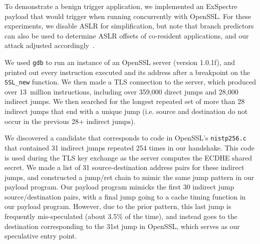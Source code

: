 To demonstrate a benign trigger application, we implemented an ExSpectre payload that
would trigger when running concurrently with OpenSSL.
For these experiments, we disable
ASLR for simplification, but note that
branch predictors can also be used to determine ASLR offsets of co-resident applications,
and our attack adjusted accordingly~\cite{evtyushkin2016jump}.

We used \texttt{gdb} to run an instance of an OpenSSL server (version 1.0.1f),
and printed out every instruction executed and its address after a breakpoint on
the \texttt{SSL\_new} function. We then made a TLS connection to the
server,
which produced over 13~million instructions, including over 359,000 direct jumps
and 28,000 indirect jumps. We then searched for the longest repeated set of more than
28 indirect jumps that end with a unique jump (i.e. source and destination do
not occur in the previous 28+ indirect jumps).

We discovered a candidate that corresponds to code in OpenSSL's
\texttt{nistp256.c} that contained 31 indirect jumps repeated 254 times in our
handshake. This code is used during the TLS key exchange as the server computes
the ECDHE shared secret. We made a list of 31 source-destination address pairs
for these indirect jumps, and constructed a jump/ret chain to mimic the same
jump pattern in
our payload program. Our payload program mimicks the first 30 indirect jump
source/destination pairs, with a final jump going to a cache timing function
in our payload program. However, due to the prior pattern, this last jump is
frequently mis-speculated (about 3.5\% of the time), and instead goes to the
destination corresponding to the 31st jump in OpenSSL, which serves as our
speculative entry point.


